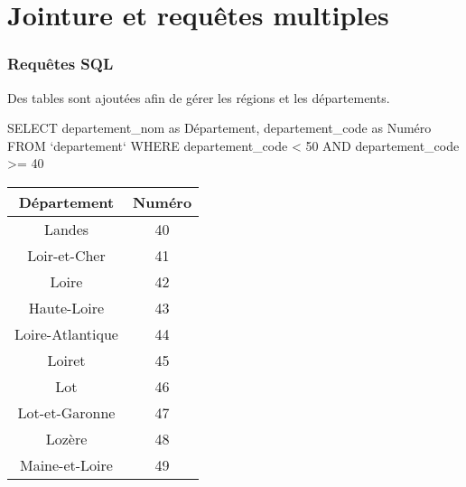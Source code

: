 \section{Jointure et requêtes multiples}

\begin{frame}[fragile]
\frametitle{Requêtes SQL}

Des tables sont ajoutées afin de gérer les régions et les départements.

\begin{GrayBox}[0.85\textwidth]
\begin{semiverbatim}\small
SELECT departement_nom as Département, departement_code as Numéro
FROM `departement`
WHERE departement_code < 50 AND departement_code >= 40
\end{semiverbatim}
\end{GrayBox}

\begin{center}
\begin{tabular}{|c|c|}
\hline
\textbf{Département} & \textbf{Numéro} \\
\hline
Landes & 40 \\
\hline
Loir-et-Cher & 41 \\
\hline
Loire & 42 \\
\hline
Haute-Loire & 43 \\
\hline
Loire-Atlantique & 44 \\
\hline
Loiret & 45 \\
\hline
Lot & 46 \\
\hline
Lot-et-Garonne & 47 \\
\hline
Lozère & 48 \\
\hline
Maine-et-Loire & 49 \\
\hline
\end{tabular}
\end{center}

\end{frame}

